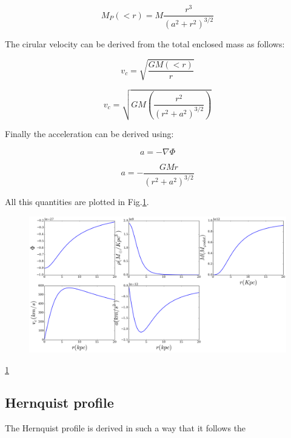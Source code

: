 \begin{equation}
M_P(<r) = M \frac{r^3}{(a^2+r^2)^{3/2}}
\end{equation}

The cirular velocity can be derived from the total enclosed mass
as follows:


\begin{equation}
v_c = \sqrt{\frac{GM(<r)}{r}}
\end{equation}

\begin{equation}
v_c = \sqrt{GM\left(\frac{r^2}{( r^2+a^2 ) ^{3/2}}\right)}
\end{equation}


Finally the acceleration can be derived using:

\begin{equation}
a = - \nabla \Phi 
\end{equation}

\begin{equation}
a = - \dfrac{GMr}{(r^2 + a^2)^{3/2}} 
\end{equation}

All this quantities are plotted in Fig.\ref{fig:plummer}.

\begin{figure}[H]
\centering
\includegraphics[scale=0.35]{../figures/plummer.png}
\label{fig:plummer}
\end{figure}

\ref{fig:plummer}

\subsection{Hernquist profile}

The Hernquist profile is derived in such a way that it follows the

